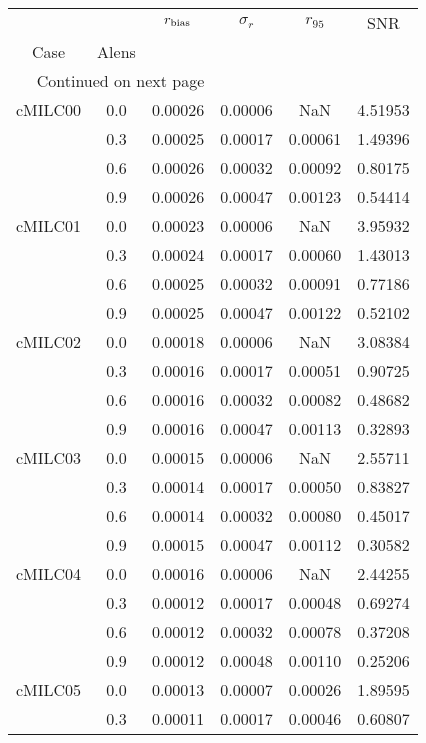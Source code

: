 \begin{longtable}{cccccc}
\toprule
        &     &  $r_{\rm bias}$  &  $\sigma_r$ &  $r_{95}$ &     SNR \\
Case & Alens &                  &             &           &         \\
\midrule
\endhead
\midrule
\multicolumn{3}{r}{{Continued on next page}} \\
\midrule
\endfoot

\bottomrule
\endlastfoot
cMILC00 & 0.0 & 0.00026 & 0.00006 & NaN & 4.51953 \\
        & 0.3 & 0.00025 & 0.00017 & 0.00061 & 1.49396 \\
        & 0.6 & 0.00026 & 0.00032 & 0.00092 & 0.80175 \\
        & 0.9 & 0.00026 & 0.00047 & 0.00123 & 0.54414 \\
cMILC01 & 0.0 & 0.00023 & 0.00006 & NaN & 3.95932 \\
        & 0.3 & 0.00024 & 0.00017 & 0.00060 & 1.43013 \\
        & 0.6 & 0.00025 & 0.00032 & 0.00091 & 0.77186 \\
        & 0.9 & 0.00025 & 0.00047 & 0.00122 & 0.52102 \\
cMILC02 & 0.0 & 0.00018 & 0.00006 & NaN & 3.08384 \\
        & 0.3 & 0.00016 & 0.00017 & 0.00051 & 0.90725 \\
        & 0.6 & 0.00016 & 0.00032 & 0.00082 & 0.48682 \\
        & 0.9 & 0.00016 & 0.00047 & 0.00113 & 0.32893 \\
cMILC03 & 0.0 & 0.00015 & 0.00006 & NaN & 2.55711 \\
        & 0.3 & 0.00014 & 0.00017 & 0.00050 & 0.83827 \\
        & 0.6 & 0.00014 & 0.00032 & 0.00080 & 0.45017 \\
        & 0.9 & 0.00015 & 0.00047 & 0.00112 & 0.30582 \\
cMILC04 & 0.0 & 0.00016 & 0.00006 & NaN & 2.44255 \\
        & 0.3 & 0.00012 & 0.00017 & 0.00048 & 0.69274 \\
        & 0.6 & 0.00012 & 0.00032 & 0.00078 & 0.37208 \\
        & 0.9 & 0.00012 & 0.00048 & 0.00110 & 0.25206 \\
cMILC05 & 0.0 & 0.00013 & 0.00007 & 0.00026 & 1.89595 \\
        & 0.3 & 0.00011 & 0.00017 & 0.00046 & 0.60807 \\

\end{longtable}
